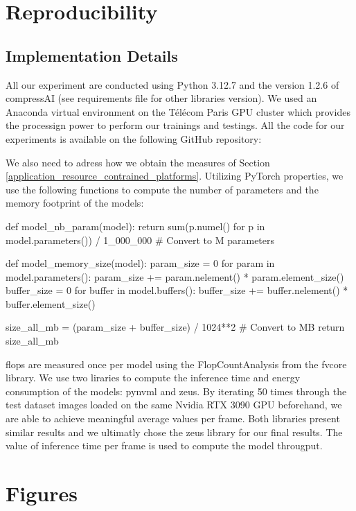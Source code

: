 \appendix

\chapter{Reproducibility}

\section{Implementation Details}
All our experiment are conducted using Python 3.12.7 and the version 1.2.6 of compressAI (see requirements file for other libraries version). We used an Anaconda virtual environment on the Télécom Paris GPU cluster which provides the processign power to perform our trainings and testings. All the code for our experiments is available on the following GitHub repository: \url{}

We also need to adress how we obtain the measures of Section \ref{application_resource_contrained_platforms}. Utilizing PyTorch properties, we use the following functions to compute the number of parameters and the memory footprint of the models:

\begin{pythonCode}
def model_nb_param(model):
    return sum(p.numel() for p in model.parameters()) / 1_000_000 # Convert to M parameters


def model_memory_size(model):
    param_size = 0
    for param in model.parameters():
        param_size += param.nelement() * param.element_size()
    buffer_size = 0
    for buffer in model.buffers():
        buffer_size += buffer.nelement() * buffer.element_size()

    size_all_mb = (param_size + buffer_size) / 1024**2 # Convert to MB
    return size_all_mb
\end{pythonCode}

\acrshort{flop}s are measured once per model using the \textsf{FlopCountAnalysis} from the fvcore library. We use two liraries to compute the inference time and energy consumption of the models: pynvml and zeus. By iterating 50 times through the test dataset images loaded on the same Nvidia RTX 3090 GPU beforehand, we are able to achieve meaningful average values per frame. Both libraries present similar results and we ultimatly chose the zeus library for our final results. The value of inference time per frame is used to compute the model througput.

\chapter{Figures}

